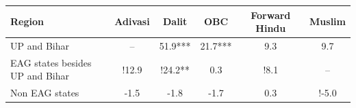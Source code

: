 \begin{tabular}{lccccc}
\hline
Region & Adivasi & Dalit & OBC & Forward Hindu & Muslim \\
\hline
UP and Bihar&--&51.9***&21.7***&9.3&9.7\\
EAG states besides UP and Bihar&!12.9&!24.2**&0.3&!8.1&--\\
Non EAG states&-1.5&-1.8&-1.7&0.3&!-5.0\\
\hline
\end{tabular}
